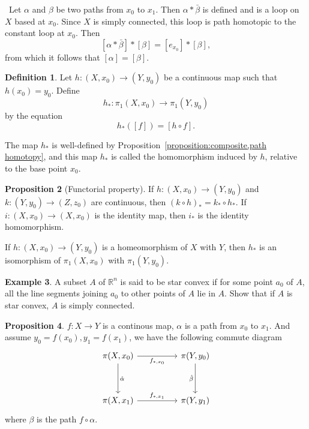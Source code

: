 \documentclass[12pt,a4paper]{book}
\newenvironment{prooff}{{\noindent\it\textcolor{cyan!40!black}{Proof}:}\,}{\par}
\theoremstyle{definition}
\newtheorem{defn}{Definition}[section]
\newtheorem{prop}[defn]{Proposition}
\newtheorem{exam}[defn]{Example}
\begin{document}
\begin{prooff}
    Let $\alpha$ and $\beta$ be two paths from $x_0$ to $x_1$. Then $\alpha * \bar{\beta}$ is defined and is a loop on $X$ based at $x_0$. Since $X$ is simply connected, this loop is path homotopic to the constant loop at $x_0$. Then
    $$
        [\alpha * \bar{\beta}] *[\beta]=\left[e_{x_0}\right] *[\beta],
    $$
    from which it follows that $[\alpha]=[\beta]$.
\end{prooff}
\begin{defn}
    Let $h:\left(X, x_0\right) \rightarrow\left(Y, y_0\right)$ be a continuous map such that $h(x_0)=y_0$. Define
    $$
        h_*: \pi_1\left(X, x_0\right) \longrightarrow \pi_1\left(Y, y_0\right)
    $$
    by the equation
    $$
        h_*([f])=[h \circ f] .
    $$

    The map $h_*$ is well-defined by Proposition~\ref{proposition:composite,path homotopy}, and this map $h_*$ is called the homomorphism induced by $h$, relative to the base point $x_0$.
\end{defn}
\begin{prop}[Functorial property]
    If $h:\left(X, x_0\right) \rightarrow\left(Y, y_0\right)$ and $k:\left(Y, y_0\right) \rightarrow\left(Z, z_0\right)$ are continuous, then $(k \circ h)_*=k_* \circ h_*$. If $i:\left(X, x_0\right) \rightarrow\left(X, x_0\right)$ is the identity map, then $i_*$ is the identity homomorphism.

    If $h:\left(X, x_0\right) \rightarrow\left(Y, y_0\right)$ is a homeomorphism of $X$ with $Y$, then $h_*$ is an isomorphism of $\pi_1\left(X, x_0\right)$ with $\pi_1\left(Y, y_0\right)$.
\end{prop}
\begin{exam}
    A subset $A$ of $\mathbb{R}^n$ is said to be star convex if for some point $a_0$ of $A$, all the line segments joining $a_0$ to other points of $A$ lie in $A$. Show that if $A$ is star convex, $A$ is simply connected.
\end{exam}
\begin{prop}
    $f:X\rightarrow Y $ is a continous map, $\alpha$ is a path from $x_0$ to $x_1$.
    And assume $y_0=f(x_0),y_1=f(x_1)$, we have the following commute diagram
    \[\begin{tikzcd}
            {\pi(X,x_0)} && {\pi(Y,y_0)} \\
            \\
            {\pi(X,x_1)} && {\pi(Y,y_1)}
            \arrow["{f_{*,x_0}}"', from=1-1, to=1-3]
            \arrow["{\hat{\alpha}}", from=1-1, to=3-1]
            \arrow["{\hat{\beta}}"', from=1-3, to=3-3]
            \arrow["{f_{*,x_1}}", from=3-1, to=3-3]
        \end{tikzcd}\]
    where $\beta$ is the path $f\circ \alpha$.
    \label{proposition:commute diagram, fundemental group}
\end{prop}
\end{document}
